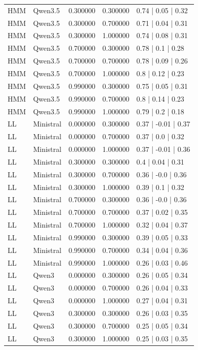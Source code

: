 \begin{longtable}{lllll}
HMM & Qwen3.5 & 0.300000 & 0.300000 & 0.74 | 0.05 | 0.32 \\
HMM & Qwen3.5 & 0.300000 & 0.700000 & 0.71 | 0.04 | 0.31 \\
HMM & Qwen3.5 & 0.300000 & 1.000000 & 0.74 | 0.08 | 0.31 \\
HMM & Qwen3.5 & 0.700000 & 0.300000 & 0.78 | 0.1 | 0.28 \\
HMM & Qwen3.5 & 0.700000 & 0.700000 & 0.78 | 0.09 | 0.26 \\
HMM & Qwen3.5 & 0.700000 & 1.000000 & 0.8 | 0.12 | 0.23 \\
HMM & Qwen3.5 & 0.990000 & 0.300000 & 0.75 | 0.05 | 0.31 \\
HMM & Qwen3.5 & 0.990000 & 0.700000 & 0.8 | 0.14 | 0.23 \\
HMM & Qwen3.5 & 0.990000 & 1.000000 & 0.79 | 0.2 | 0.18 \\
LL & Ministral & 0.000000 & 0.300000 & 0.37 | -0.01 | 0.37 \\
LL & Ministral & 0.000000 & 0.700000 & 0.37 | 0.0 | 0.32 \\
LL & Ministral & 0.000000 & 1.000000 & 0.37 | -0.01 | 0.36 \\
LL & Ministral & 0.300000 & 0.300000 & 0.4 | 0.04 | 0.31 \\
LL & Ministral & 0.300000 & 0.700000 & 0.36 | -0.0 | 0.36 \\
LL & Ministral & 0.300000 & 1.000000 & 0.39 | 0.1 | 0.32 \\
LL & Ministral & 0.700000 & 0.300000 & 0.36 | -0.0 | 0.36 \\
LL & Ministral & 0.700000 & 0.700000 & 0.37 | 0.02 | 0.35 \\
LL & Ministral & 0.700000 & 1.000000 & 0.32 | 0.04 | 0.37 \\
LL & Ministral & 0.990000 & 0.300000 & 0.39 | 0.05 | 0.33 \\
LL & Ministral & 0.990000 & 0.700000 & 0.34 | 0.04 | 0.36 \\
LL & Ministral & 0.990000 & 1.000000 & 0.26 | 0.03 | 0.46 \\
LL & Qwen3 & 0.000000 & 0.300000 & 0.26 | 0.05 | 0.34 \\
LL & Qwen3 & 0.000000 & 0.700000 & 0.26 | 0.04 | 0.33 \\
LL & Qwen3 & 0.000000 & 1.000000 & 0.27 | 0.04 | 0.31 \\
LL & Qwen3 & 0.300000 & 0.300000 & 0.26 | 0.03 | 0.35 \\
LL & Qwen3 & 0.300000 & 0.700000 & 0.25 | 0.05 | 0.34 \\
LL & Qwen3 & 0.300000 & 1.000000 & 0.25 | 0.03 | 0.35 \\

\end{longtable}
